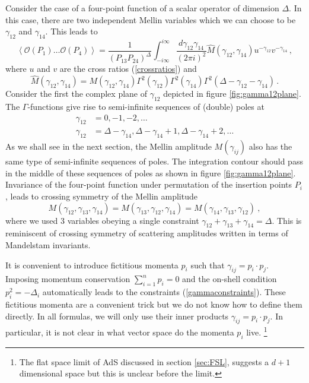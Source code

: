\documentclass{ws-rv9x6}
\newcommand\be{\begin{equation}}
\newcommand\ee{\end{equation}}
\begin{document}
Consider the case of a four-point function of a scalar operator of dimension $\Delta$. In this case, there are two independent Mellin variables which we can choose to be $\gamma_{12}$ and $\gamma_{14}$. This leads to
\be
\left\langle \mathcal{O}(P_1) \dots \mathcal{O}(P_4) \right\rangle =
\frac{1}{(P_{13}P_{24})^\Delta}
\int_{-i\infty}^{i\infty} \frac{d\gamma_{12}\gamma_{14}}{(2\pi i)^2}   \hat{M}(\gamma_{12}, \gamma_{14}) u^{-\gamma_{12}}  v^{-\gamma_{14}} \,,
\ee
where $u$ and $v$ are the cross ratios (\ref{crossratios}) and 
\be
\hat{M}(\gamma_{12}, \gamma_{14})=M(\gamma_{12}, \gamma_{14})
 \Gamma^2(\gamma_{12})
 \Gamma^2(\gamma_{14})
  \Gamma^2(\Delta-\gamma_{12}-\gamma_{14})\,.
\ee
Consider the first the complex plane of $\gamma_{12}$ depicted in figure \ref{fig:gamma12plane}.
The $\Gamma$-functions give rise to semi-infinite sequences of (double) poles at
\begin{align}
\gamma_{12}&=0, -1, -2, \dots  \label{eq:gamma12poles1}\\
\gamma_{12}&=\Delta-\gamma_{14}, \Delta-\gamma_{14}+1, \Delta-\gamma_{14}+2, \dots 
\label{eq:gamma12poles2}
\end{align}
As we shall see in the next section, the Mellin amplitude $M(\gamma_{ij})$ also has the same type of semi-infinite sequences of poles. The integration contour should pass in the middle of these sequences of poles as shown in figure \ref{fig:gamma12plane}.
Invariance of the four-point function under permutation of the insertion points $P_i$, leads to crossing symmetry of the Mellin amplitude
\be
M(\gamma_{12}, \gamma_{13}, \gamma_{14}) =
M(\gamma_{13}, \gamma_{12}, \gamma_{14}) =
M(\gamma_{14}, \gamma_{13}, \gamma_{12}) \ ,
\ee
where we used 3 variables obeying a single constraint $\gamma_{12}+ \gamma_{13}+ \gamma_{14}=\Delta$.
This is reminiscent of crossing symmetry of scattering amplitudes written in terms of Mandelstam invariants. 


It is convenient to introduce fictitious momenta $p_i$ such that $\gamma_{ij}=p_i\cdot p_j$. 
Imposing momentum conservation $\sum_{i=1}^n p_i=0$ and the on-shell condition $p_i^2=-\Delta_i$ automatically leads to the constraints (\ref{gammaconstraints}).
These fictitious momenta are a convenient trick but we do not know how to define them directly.
In all formulas, we will only use their inner products $\gamma_{ij}=p_i\cdot p_j$. 
In particular, it is not clear in what vector space do the momenta $p_i$ live. 
\footnote{The flat space limit of AdS discussed in section \ref{sec:FSL}, suggests a $d+1$ dimensional space but this is unclear before the limit.}
\end{document}
